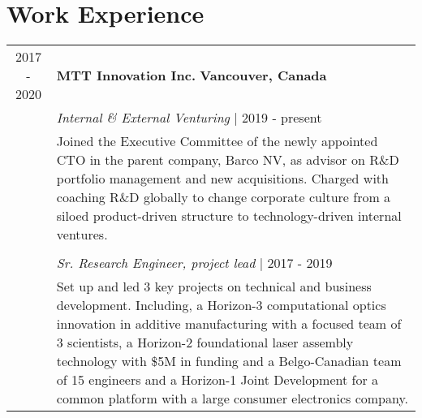 \documentclass[a4paper,10pt]{article}
\begin{document}
\pagestyle{plain}
\USheader

\section{Work Experience}
\begin{tabularx}{\textwidth}{cX}
2017 - 2020 & \textbf{MTT Innovation Inc.} \hfill \textbf{Vancouver, Canada} \\
& \textit{Internal \& External Venturing} | 2019 - present \\
& Joined the Executive Committee of the newly appointed CTO in the parent company, Barco NV,
as advisor on R\&D portfolio management and new acquisitions. %
Charged with coaching R\&D globally to change corporate culture from a siloed product-driven %
structure to technology-driven internal ventures. \\
& \\
& \textit{Sr. Research Engineer, project lead} | 2017 - 2019 \\
& Set up and led 3 key projects on technical and business development. Including, 
a Horizon-3 computational optics innovation in additive manufacturing with a focused team of 3 scientists, 
a Horizon-2 foundational laser assembly technology with \$5M in funding and a Belgo-Canadian team of 15 engineers
and a Horizon-1 Joint Development for a common platform with a large consumer electronics company.

\end{tabularx}
\end{document}

